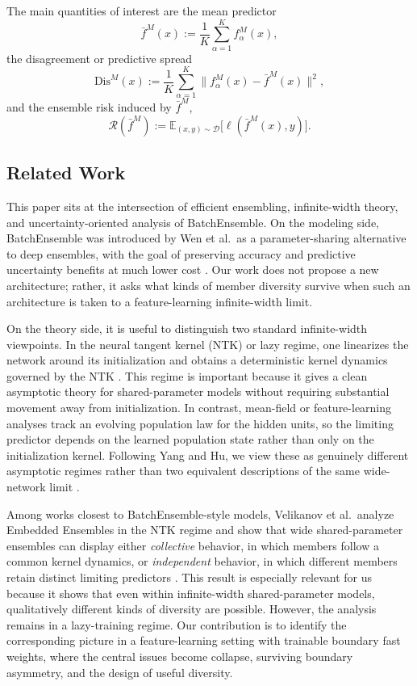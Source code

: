 \documentclass{article}
\newcommand{\E}{\mathbb{E}}
\begin{document}
The main quantities of interest are the mean predictor
\[
\bar f^M(x):=\frac{1}{K}\sum_{\alpha=1}^K f^M_\alpha(x),
\]
the disagreement or predictive spread
\[
\mathrm{Dis}^M(x):=\frac{1}{K}\sum_{\alpha=1}^K \|f^M_\alpha(x)-\bar f^M(x)\|^2,
\]
and the ensemble risk induced by $\bar f^M$,
\[
\mathcal R(\bar f^M):=\E_{(x,y)\sim \mathcal D}\bigl[\ell(\bar f^M(x),y)\bigr].
\]

\subsection{Related Work}

This paper sits at the intersection of efficient ensembling, infinite-width theory, and uncertainty-oriented analysis of BatchEnsemble. On the modeling side, BatchEnsemble was introduced by Wen et al.\ as a parameter-sharing alternative to deep ensembles, with the goal of preserving accuracy and predictive uncertainty benefits at much lower cost \cite{wen2020}. Our work does not propose a new architecture; rather, it asks what kinds of member diversity survive when such an architecture is taken to a feature-learning infinite-width limit.

On the theory side, it is useful to distinguish two standard infinite-width viewpoints. In the neural tangent kernel (NTK) or lazy regime, one linearizes the network around its initialization and obtains a deterministic kernel dynamics governed by the NTK \cite{jacot2018}. This regime is important because it gives a clean asymptotic theory for shared-parameter models without requiring substantial movement away from initialization. In contrast, mean-field or feature-learning analyses track an evolving population law for the hidden units, so the limiting predictor depends on the learned population state rather than only on the initialization kernel. Following Yang and Hu, we view these as genuinely different asymptotic regimes rather than two equivalent descriptions of the same wide-network limit \cite{yanghu2020}.

Among works closest to BatchEnsemble-style models, Velikanov et al.\ analyze Embedded Ensembles in the NTK regime and show that wide shared-parameter ensembles can display either \emph{collective} behavior, in which members follow a common kernel dynamics, or \emph{independent} behavior, in which different members retain distinct limiting predictors \cite{velikanov2022}. This result is especially relevant for us because it shows that even within infinite-width shared-parameter models, qualitatively different kinds of diversity are possible. However, the analysis remains in a lazy-training regime. Our contribution is to identify the corresponding picture in a feature-learning setting with trainable boundary fast weights, where the central issues become collapse, surviving boundary asymmetry, and the design of useful diversity.
\end{document}
